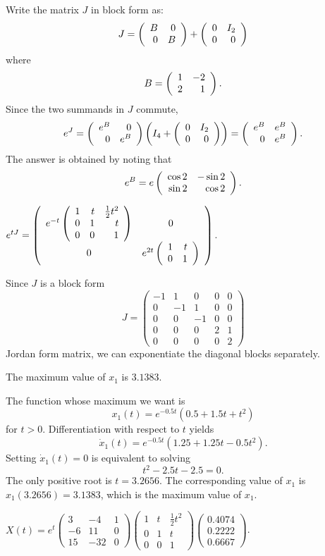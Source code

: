 \soln Write the matrix $J$ in block form as:
\[
J = \left(\begin{array}{rr} B & 0\\ 0 &B\end{array}\right) + \left(\begin{array}{rr} 0 & I_2\\ 0 &0\end{array}\right)
\]
where 
\[
B = \left(\begin{array}{rr} 1 & -2\\ 2 &1\end{array}\right).
\]
Since the two summands in $J$ commute, 
\[
e^J = \left(\begin{array}{rr} e^B & 0\\ 0 &e^B\end{array}\right)\left(I_4 + \left(\begin{array}{rr} 0 & I_2\\ 0 &0\end{array}\right)\right)
= \left(\begin{array}{rr} e^B & e^B\\ 0 &e^B\end{array}\right).
\]
The answer is obtained by noting that 
\[
e^B = e\left(\begin{array}{rr} \cos 2 & -\sin 2\\ \sin 2 &\cos 2\end{array}\right).
\]


\ans $e^{tJ}= \left(\begin{array}{cc} e^{-t}\left(\begin{array}{rrr} 
 1 & t & \frac{1}{2}t^2\\ 0 & 1 & t\\ 0 & 0 & 1\end{array}\right) & 0\\ 0 &e^{2t}\left(\begin{array}{rr} 1 & t\\ 0 &1\end{array}\right)\end{array}\right)$.

\soln Since $J$ is a block form
\[
J = \left(\begin{array}{rrr|rr} 
-1 &  1 &  0 &  0 & 0 \\ 
 0 & -1 &  1 &  0 & 0 \\
 0 &  0 & -1 &  0 & 0 \\
\hline
 0 &  0 &  0 &  2 & 1 \\
 0 &  0 &  0 &  0 & 2
\end{array}\right)
\]
Jordan form matrix, we can exponentiate the diagonal blocks separately.

 \ans The maximum value of $x_1$ is $3.1383$.

\soln The function whose maximum we want is 
\[
x_1(t)  =  e^{-0.5t}(0.5 + 1.5t + t^2)
\]
for $t>0$.  Differentiation with respect to $t$ yields 
\[
\dot{x}_1(t) = e^{-0.5t}(1.25 + 1.25t - 0.5t^2).
\]
Setting $\dot{x}_1(t) = 0$ is equivalent to solving 
\[
t^2 - 2.5t - 2.5 = 0.
\]
The only positive root is $t=3.2656$.  The corresponding value of $x_1$ is
$x_1(3.2656) = 3.1383$, which is the maximum value of $x_1$.

\ans $X(t) = e^t\left(\begin{array}{rrr}
     3  &  -4   &   1\\
    -6   &  11   &   0\\
    15   & -32   &   0 \end{array}\right)
\left(\begin{array}{rrr}
     1  &  t   &   \frac{1}{2}t^2\\
    0   &  1   &   t\\
    0   &  0   &   1 \end{array}\right)
\left(\begin{array}{r} 0.4074\\ 0.2222\\ 0.6667\end{array}\right)$.

